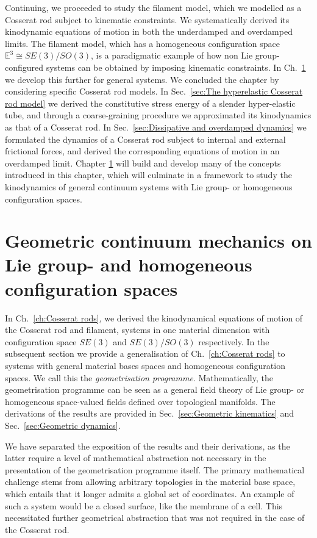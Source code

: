 Continuing, we proceeded to study the filament model, which we modelled as a Cosserat rod subject to kinematic constraints. We systematically derived its kinodynamic equations of motion in both the underdamped and overdamped limits. The filament model, which has a homogeneous configuration space $\mathbb{E}^3 \cong SE(3)/SO(3)$, is a paradigmatic example of how non Lie group-configured systems can be obtained by imposing kinematic constraints. In Ch.~\ref{ch:Geometric continuum mechanics on homogeneous configuration spaces} we develop this further for general systems. We concluded the chapter by considering specific Cosserat rod models. In Sec.~\ref{sec:The hyperelastic Cosserat rod model} we derived the constitutive stress energy of a slender hyper-elastic tube, and through a coarse-graining procedure we approximated its kinodynamics as that of a Cosserat rod. In Sec.~\ref{sec:Dissipative and overdamped dynamics} we formulated the dynamics of a Cosserat rod subject to internal and external frictional forces, and derived the corresponding equations of motion in an overdamped limit. Chapter \ref{ch:Geometric continuum mechanics on homogeneous configuration spaces} will build and develop many of the concepts introduced in this chapter, which will culminate in a framework to study the kinodynamics of general continuum systems with Lie group- or homogeneous configuration spaces.


\chapter{Geometric continuum mechanics on Lie group- and homogeneous configuration spaces} \label{ch:Geometric continuum mechanics on homogeneous configuration spaces}

In Ch.~\ref{ch:Cosserat rods}, we derived the kinodynamical equations of motion of the Cosserat rod and filament, systems in one material dimension with configuration space $SE(3)$ and $SE(3)/SO(3)$ respectively. In the subsequent section we provide a generalisation of Ch.~\ref{ch:Cosserat rods} to systems with general material bases spaces and homogeneous configuration spaces. We call this the \textit{geometrisation programme}. Mathematically, the geometrisation programme can be seen as a general field theory of Lie group- or homogeneous space-valued fields defined over topological manifolds. The derivations of the results are provided in Sec.~\ref{sec:Geometric kinematics} and Sec.~\ref{sec:Geometric dynamics}. 

We have separated the exposition of the results and their derivations, as the latter require a level of mathematical abstraction not necessary in the presentation of the geometrisation programme itself. The primary mathematical challenge stems from allowing arbitrary topologies in the material base space, which entails that it longer admits a global set of coordinates. An example of such a system would be a closed surface, like the membrane of a cell. This necessitated further geometrical abstraction that was not required in the case of the Cosserat rod. 

